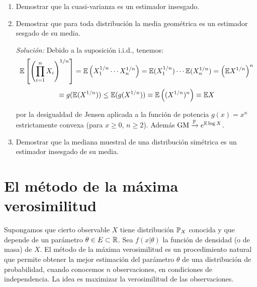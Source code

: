 \begin{enumerate}
  \smallskip
  \noindent\textit{Solución:} Las propiedades de la media y varianza nos dan, obviamente, $\E\Theta_n^{(1)} = \mu$. Además:
  \[
    \E\Theta_n^{(2)} = \frac{2}{n}(\E X_1 + \E X_3 + \E X_5 + \dots) = \frac{2}{n}\cdot\frac{n}{2}\E X_1 = \mu
  \]
  
  \[
    \Var\Theta_n^{(2)} = \frac{4}{n^2}(\Var X_1 + \Var X_3 + \Var X_5 + \dots) = \frac{4}{n^2}\cdot\frac{n}{2}\Var X_1 = \frac{2\sigma^2}{n} > \Var\Theta_n^{(1)} \equiv \frac{\sigma^2}{n}
  \]
 
  y, por tanto, el primero es más eficiente que el segundo. Esto refleja que solo $T^{(1)}(x_1, \dots, x_n) = (x_1 + \dots + x_n)/n$ es una función simétrica de la muestra $\vec{x} \coloneqq (x_1, \dots, x_n)$, mientras que $T^{(2)}$ no lo es (al permutar $x_1$ y $x_2$). Al eliminar y repetir observaciones aumenta la varianza.

  \item Demostrar que la cuasi-varianza es un estimador insesgado.

  \item Demostrar que para toda distribución la media geométrica es un estimador sesgado de su media.

  \smallskip
  \noindent\textit{Solución:} Debido a la suposición i.i.d., tenemos:
  \[
    \mathbb{E}\left[\left(\prod_{i=1}^n X_i\right)^{1/n}\right] = \mathbb{E}\left(X_1^{1/n}\cdots X_n^{1/n}\right) = \mathbb{E}(X_1^{1/n})\cdots\mathbb{E}(X_n^{1/n}) = \left(\mathbb{E} X^{1/n}\right)^n \]
    \[ \equiv g(\mathbb{E}(X^{1/n})) \leq \mathbb{E}(g(X^{1/n})) \equiv \mathbb{E}\left((X^{1/n})^n\right) \equiv \mathbb{E} X
  \]
 
  por la desigualdad de Jensen aplicada a la función de potencia $g(x) = x^n$ estrictamente convexa (para $x \geq 0$, $n \geq 2$). Además $\operatorname{GM} \xrightarrow{\mathbb{P}} e^{\mathbb{E}\log X}$.

  \item Demostrar que la mediana muestral de una distribución simétrica es un estimador insesgado de su media.
\end{enumerate}




\chapter{El método de la máxima verosimilitud}
Supongamos que cierto observable $X$ tiene distribución $\mathbb{P}_X$ conocida y que depende de un parámetro $\theta \in E \subset \mathbb{R}$. Sea $f(x|\theta)$ la función de densidad (o de masa) de $X$. El método de la máxima verosimilitud es un procedimiento natural que permite obtener la mejor estimación del parámetro $\theta$ de una distribución de probabilidad, cuando conocemos $n$ observaciones, en condiciones de independencia. La idea es maximizar la verosimilitud de las observaciones.

